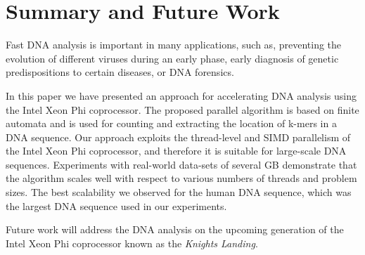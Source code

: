 \documentclass[conference]{IEEEtran}
\begin{document}
\section{Summary and Future Work} 
\label{summary_future_work}

Fast DNA analysis is important in many applications, such as, preventing the evolution of different viruses during an early phase, early diagnosis of genetic predispositions to certain diseases, or DNA forensics. 

In this paper we have presented an approach for accelerating DNA analysis using the Intel Xeon Phi coprocessor. The proposed parallel algorithm is based on finite automata and is used for counting and extracting the location of k-mers in a DNA sequence. Our approach exploits the thread-level and SIMD parallelism of the Intel Xeon Phi coprocessor, and therefore it is suitable for large-scale DNA sequences. Experiments with real-world data-sets of several GB demonstrate that the algorithm scales well with respect to various numbers of threads and problem sizes. The best scalability we observed for the human DNA sequence, which was the largest DNA sequence used in our experiments. 

Future work will address the DNA analysis on the upcoming generation of the Intel Xeon Phi coprocessor known as the \emph{Knights Landing}.



\end{document}
